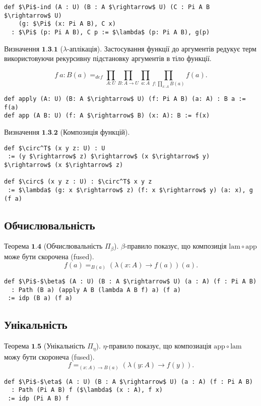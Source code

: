 \documentclass{article}
\theoremstyle{definition}
\begin{document}
\begin{lstlisting}[mathescape=true]
def $\Pi$-ind (A : U) (B : A $\rightarrow$ U) (C : Pi A B $\rightarrow$ U)
    (g: $\Pi$ (x: Pi A B), C x)
  : $\Pi$ (p: Pi A B), C p := $\lambda$ (p: Pi A B), g(p)
\end{lstlisting}

\noindent $\textbf{Визначення\ 1.3.1}$ ($\lambda$-аплікація).
Застосування функції до аргументів редукує терм
використовуючи рекурсивну підстановку аргументів в тіло функції.

$$
    f\ a : B(a) =_{def} \prod_{A:U}\prod_{B: A \rightarrow U}\prod_{a:A}\prod_{f: \prod_{x:A}B(a)}f(a).
$$

\begin{lstlisting}[mathescape=true]
def apply (A: U) (B: A $\rightarrow$ U) (f: Pi A B) (a: A) : B a := f(a)
def app (A B: U) (f: A $\rightarrow$ B) (x: A): B := f(x)
\end{lstlisting}

\noindent $\textbf{Визначення\ 1.3.2}$ (Композиція функцій).
\begin{lstlisting}[mathescape=true]
def $\circ^T$ (x y z: U) : U
 := (y $\rightarrow$ z) $\rightarrow$ (x $\rightarrow$ y) $\rightarrow$ (x $\rightarrow$ z)

def $\circ$ (x y z : U) : $\circ^T$ x y z
 := $\lambda$ (g: x $\rightarrow$ z) (f: x $\rightarrow$ y) (a: x), g (f a)
\end{lstlisting}

\subsection{Обчислювальність}

$\textbf{Теорема\ 1.4}$ (Обчислювальність $\Pi_\beta$).
$\beta$-правило показує, що композиція $\mathrm{lam} \circ \mathrm{app}$ може бути скорочена (fused).
$$
    f(a) =_{B(a)} (\lambda (x:A) \rightarrow f(a))(a).
$$
\begin{lstlisting}[mathescape=true]
def $\Pi$-$\beta$ (A : U) (B : A $\rightarrow$ U) (a : A) (f : Pi A B)
  : Path (B a) (apply A B (lambda A B f) a) (f a)
 := idp (B a) (f a)
\end{lstlisting}

\subsection{Унікальність}

$\textbf{Теорема\ 1.5}$ (Унікальність $\Pi_\eta$).
$\eta$-правило показує, що композиація $\mathrm{app} \circ \mathrm{lam}$ можу бути скоронеча (fused).
$$
    f =_{(x:A)\rightarrow B(a)} (\lambda (y:A) \rightarrow f(y)).
$$
\begin{lstlisting}[mathescape=true]
def $\Pi$-$\eta$ (A : U) (B : A $\rightarrow$ U) (a : A) (f : Pi A B)
  : Path (Pi A B) f ($\lambda$ (x : A), f x)
 := idp (Pi A B) f
\end{lstlisting}
\end{document}
